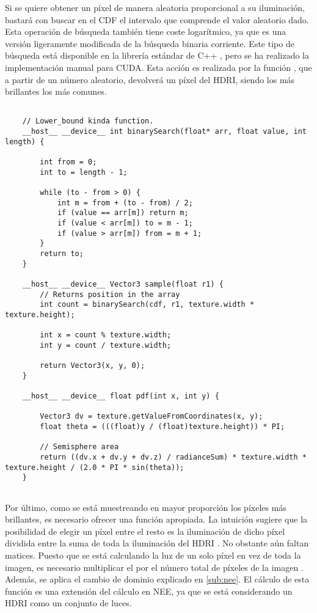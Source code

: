 Si se quiere obtener un píxel de manera aleatoria proporcional a su iluminación, bastará con buscar en el CDF el intervalo que comprende el valor aleatorio dado. Esta operación de búsqueda también tiene coste logarítmico, ya que es una versión ligeramente modificada de la búsqueda binaria corriente. Este tipo de búsqueda está disponible en la librería estándar de C++ , pero se ha realizado la implementación manual para CUDA. Esta acción es realizada por la función , que a partir de un número aleatorio, devolverá un píxel del HDRI, siendo los más brillantes los más comunes.

\begin{minipage}[c]{0.95\textwidth}
\begin{lstlisting}[label={cod:hdriis}, caption={Código para el muestreo por importancia de entorno y función auxiliar}]
	
	// Lower_bound kinda function.
	__host__ __device__ int binarySearch(float* arr, float value, int length) {

		int from = 0;
		int to = length - 1;

		while (to - from > 0) {
			int m = from + (to - from) / 2;
			if (value == arr[m]) return m;
			if (value < arr[m])	to = m - 1;
			if (value > arr[m]) from = m + 1;
		}
		return to;
	}
	
	__host__ __device__ Vector3 sample(float r1) {
		// Returns position in the array
		int count = binarySearch(cdf, r1, texture.width * texture.height);

		int x = count % texture.width;
		int y = count / texture.width;

		return Vector3(x, y, 0);
	}
	
	__host__ __device__ float pdf(int x, int y) {

		Vector3 dv = texture.getValueFromCoordinates(x, y);
		float theta = (((float)y / (float)texture.height)) * PI;

		// Semisphere area
		return ((dv.x + dv.y + dv.z) / radianceSum) * texture.width * texture.height / (2.0 * PI * sin(theta));
	}
	
\end{lstlisting}
\end{minipage}

Por último, como se está muestreando en mayor proporción los píxeles más brillantes, es necesario ofrecer una función  apropiada. La intuición sugiere que la posibilidad de elegir un píxel entre el resto es la iluminación de dicho píxel dividida entre la suma de toda la iluminación del HDRI . No obstante aún faltan matices. Puesto que se está calculando la luz de un solo píxel en vez de toda la imagen, es necesario multiplicar el  por el número total de píxeles de la imagen . Además, se aplica el cambio de dominio explicado en \autoref{sub:nee}. El cálculo de esta función  es una extensión del cálculo en NEE, ya que se está considerando un HDRI como un conjunto de luces.

